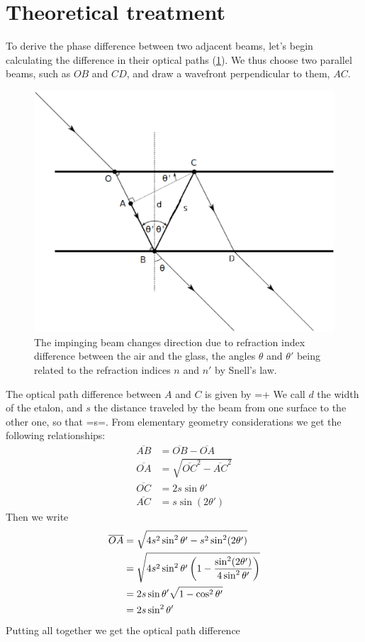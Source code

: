 	\section{Theoretical treatment}
To derive the phase difference between two adjacent beams, let's begin calculating the difference in their optical paths (\cref{fig:angoli}). We thus choose two parallel beams, such as $OB$ and $CD$, and draw a wavefront perpendicular to them, $AC$. 
\begin{figure}[!htb]\centering
\includegraphics[width=.8\linewidth, draft=\foto]{eps/angoli.eps}
\caption{The impinging beam changes direction due to refraction index difference between the air and the glass, the angles $\theta$ and $\theta'$ being related to the refraction indices $n$ and $n'$ by Snell's law.}
\label{fig:angoli}
\end{figure}
The optical path difference between $A$ and $C$ is given by
\mate
{}=+
\atem
 We call $d$ the width of the etalon, and $s$ the distance traveled by the beam from one surface to the other one, so that
\mate
{}=\equiv s=.
\atem
From elementary geometry considerations we get the following relationships:
\begin{align}
\overline{AB}&=\overline{OB}-\overline{OA}\\
\overline{OA}&=\sqrt{\overline{OC}^2-\overline{AC}^2}\\
\overline{OC}&=2s\sin\theta'\\
\overline{AC}&=s\sin(2\theta')
\end{align}
Then we write
\begin{align}
\overline{OA}&=\sqrt{4s^2\sin^2\theta'-s^2\sin^2(2\theta')}
\nonumber\\&= \sqrt{4s^2\sin^2\theta'\left(1-\frac{\sin^2(2\theta')}{4\sin^2\theta'}\right)}
\nonumber\\&= 2s\sin\theta'\sqrt{1-\cos^2\theta'}
\nonumber\\&= 2s\sin^2\theta'
\end{align}
Putting all together we get the optical path difference

